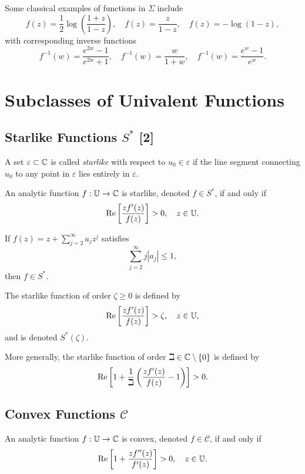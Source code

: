 Some classical examples of functions in \(\Sigma\) include
\[
f(z) = \frac{1}{2} \log \left(\frac{1+z}{1-z}\right), \quad 
f(z) = \frac{z}{1-z}, \quad 
f(z) = -\log(1-z),
\]
with corresponding inverse functions
\[
f^{-1}(w) = \frac{e^{2w}-1}{e^{2w}+1}, \quad 
f^{-1}(w) = \frac{w}{1+w}, \quad 
f^{-1}(w) = \frac{e^w - 1}{e^w}.
\]
\section{Subclasses of Univalent Functions}

\subsection[Starlike Functions \(S^*\)]{Starlike Functions \(S^*\) [2]}
A set \(\varepsilon \subset \mathbb{C}\) is called \emph{starlike} with respect to \(u_0 \in \varepsilon\) if the line segment connecting \(u_0\) to any point in \(\varepsilon\) lies entirely in \(\varepsilon\).  

\begin{theorem}\label{thm:starlike}
	An analytic function \(f:\mathbb{U} \to \mathbb{C}\) is starlike, denoted \(f \in S^*\), if and only if
	\[
	\operatorname{Re}\left[\frac{z f'(z)}{f(z)}\right] > 0, \quad z \in \mathbb{U}.
	\]
\end{theorem}

\begin{example}
	If \(f(z) = z + \sum_{j=2}^{\infty} a_j z^j\) satisfies
	\[
	\sum_{j=2}^{\infty} j |a_j| \le 1,
	\]
	then \(f \in S^*\).
\end{example}

\begin{definition}[{[2]}]
	The starlike function of order \(\zeta \ge 0\) is defined by
	\[
	\operatorname{Re}\left[\frac{z f'(z)}{f(z)}\right] > \zeta, \quad z \in \mathbb{U},
	\]
	and is denoted \(S^*(\zeta)\).
\end{definition}

\begin{definition}[{[2]}]
	More generally, the starlike function of order \(\beth \in \mathbb{C} \setminus \{0\}\) is defined by
	\[
	\operatorname{Re}\left[ 1 + \frac{1}{\beth} \left(\frac{z f'(z)}{f(z)} - 1 \right) \right] > 0.
	\]
\end{definition}

\newpage
\subsection{Convex Functions \(\mathcal{C}\)}

\begin{theorem}[{[2]}]\label{thm:convex}
	An analytic function \(f:\mathbb{U} \to \mathbb{C}\) is convex, denoted \(f \in \mathcal{C}\), if and only if
	\[
	\operatorname{Re}\left[ 1 + \frac{z f''(z)}{f'(z)} \right] > 0, \quad z \in \mathbb{U}.
	\]
\end{theorem}

